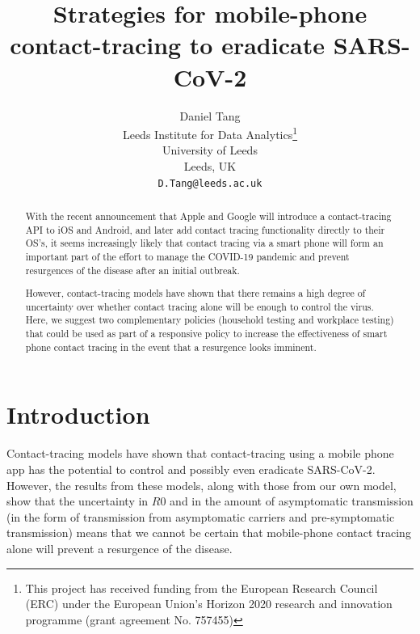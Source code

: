 \documentclass{article}
\title{Strategies for mobile-phone contact-tracing to eradicate SARS-CoV-2}
\author{
  Daniel Tang\\
  Leeds Institute for Data Analytics\thanks{This project has received funding from the European Research Council (ERC) under the European Union’s Horizon 2020 research and innovation programme (grant agreement No. 757455)}\\
  University of Leeds\\
  Leeds, UK\\
  \texttt{D.Tang@leeds.ac.uk} \\
}
\begin{document}
\maketitle

\begin{abstract}
With the recent announcement\cite{applegoogle} that Apple and Google will introduce a contact-tracing API to iOS and Android, and later add contact tracing functionality directly to their OS's, it seems increasingly likely that contact tracing via a smart phone will form an important part of the effort to manage the COVID-19 pandemic and prevent resurgences of the disease after an initial outbreak.

However, contact-tracing models have shown \cite{Ferrettieabb6936}\cite{hellewellfeasibility} that there remains a high degree of uncertainty over whether contact tracing alone will be enough to control the virus. Here, we suggest two complementary policies (household testing and workplace testing) that could be used as part of a responsive policy to increase the effectiveness of smart phone contact tracing in the event that a resurgence looks imminent.
\end{abstract}


\section{Introduction}

Contact-tracing models\cite{Ferrettieabb6936}\cite{hellewellfeasibility} have shown that contact-tracing using a mobile phone app has the potential to control and possibly even eradicate SARS-CoV-2. However, the results from these models, along with those from our own model, show that the uncertainty in $R0$ and in the amount of asymptomatic transmission (in the form of transmission from asymptomatic carriers and pre-symptomatic transmission) means that we cannot be certain that mobile-phone contact tracing alone will prevent a resurgence of the disease.
\end{document}
